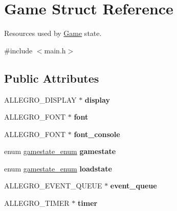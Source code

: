 \hypertarget{structGame}{\section{\-Game \-Struct \-Reference}
\label{structGame}
}


\-Resources used by \hyperlink{structGame}{\-Game} state.  




{\ttfamily \#include $<$main.\-h$>$}

\subsection*{\-Public \-Attributes}
\begin{DoxyCompactItemize}
\item 
\hypertarget{structGame_a2bf8ece79fe05b03c31f2e2ede42e5f5}{\-A\-L\-L\-E\-G\-R\-O\-\_\-\-D\-I\-S\-P\-L\-A\-Y $\ast$ {\bfseries display}}\label{structGame_a2bf8ece79fe05b03c31f2e2ede42e5f5}

\item 
\hypertarget{structGame_a455bfdaacd5f2bda80b640c02ec3250e}{\-A\-L\-L\-E\-G\-R\-O\-\_\-\-F\-O\-N\-T $\ast$ {\bfseries font}}\label{structGame_a455bfdaacd5f2bda80b640c02ec3250e}

\item 
\hypertarget{structGame_a692f2c3ec0f3e956aa8bdac00a864bf8}{\-A\-L\-L\-E\-G\-R\-O\-\_\-\-F\-O\-N\-T $\ast$ {\bfseries font\-\_\-console}}\label{structGame_a692f2c3ec0f3e956aa8bdac00a864bf8}

\item 
\hypertarget{structGame_a5118a01ee6bb74fb41e8e8880a5b85a2}{enum \hyperlink{main_8h_ae1e9f94402d151ae1adc212237a6d153}{gamestate\-\_\-enum} {\bfseries gamestate}}\label{structGame_a5118a01ee6bb74fb41e8e8880a5b85a2}

\item 
\hypertarget{structGame_a026bb8ebb6454c0d87dea503eafa9197}{enum \hyperlink{main_8h_ae1e9f94402d151ae1adc212237a6d153}{gamestate\-\_\-enum} {\bfseries loadstate}}\label{structGame_a026bb8ebb6454c0d87dea503eafa9197}

\item 
\hypertarget{structGame_a820782e408ff7a704dc12af67eb0c44f}{\-A\-L\-L\-E\-G\-R\-O\-\_\-\-E\-V\-E\-N\-T\-\_\-\-Q\-U\-E\-U\-E $\ast$ {\bfseries event\-\_\-queue}}\label{structGame_a820782e408ff7a704dc12af67eb0c44f}

\item 
\hypertarget{structGame_a8d6d4f06c6412d085112cd007977d868}{\-A\-L\-L\-E\-G\-R\-O\-\_\-\-T\-I\-M\-E\-R $\ast$ {\bfseries timer}}\label{structGame_a8d6d4f06c6412d085112cd007977d868}


\end{DoxyCompactItemize}
